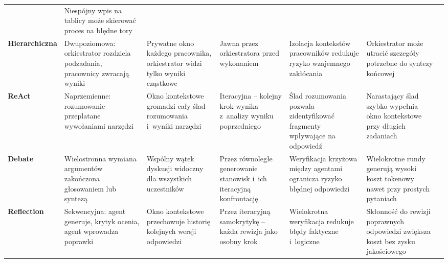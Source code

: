 \begin{table}
\begin{tabularx}{0.95\textheight}{@{} l L L L L L l @{}}
     & Niespójny wpis na tablicy może skierować proces na błędne tory
     & \cite{wang2024survey}                                                            \\
    \addlinespace
    \textbf{Hierarchiczna}
     & Dwupoziomowa: orkiestrator rozdziela podzadania, pracownicy zwracają wyniki
     & Prywatne okno każdego pracownika, orkiestrator widzi tylko wyniki cząstkowe
     & Jawna przez orkiestratora przed wykonaniem
     & Izolacja kontekstów pracowników redukuje ryzyko wzajemnego zakłócania
     & Orkiestrator może utracić szczegóły potrzebne do syntezy końcowej
     & \cite{hong2023metagpt, wu2024autogen}                                            \\
    \addlinespace
    \textbf{ReAct}
     & Naprzemienne: rozumowanie przeplatane wywołaniami narzędzi
     & Okno kontekstowe gromadzi cały ślad rozumowania i~wyniki narzędzi
     & Iteracyjna -- kolejny krok wynika z~analizy wyniku poprzedniego
     & Ślad rozumowania pozwala zidentyfikować fragmenty wpływające na odpowiedź
     & Narastający ślad szybko wypełnia okno kontekstowe przy długich zadaniach
     & \cite{yao2022react}                                                              \\
    \addlinespace
    \textbf{Debate}
     & Wielostronna wymiana argumentów zakończona głosowaniem lub syntezą
     & Wspólny wątek dyskusji widoczny dla wszystkich uczestników
     & Przez równoległe generowanie stanowisk i~ich iteracyjną konfrontację
     & Weryfikacja krzyżowa między agentami ogranicza ryzyko błędnej odpowiedzi
     & Wielokrotne rundy generują wysoki koszt tokenowy nawet przy prostych pytaniach
     & \cite{du2024improving}                                                           \\
    \addlinespace
    \textbf{Reflection}
     & Sekwencyjna: agent generuje, krytyk ocenia, agent wprowadza poprawki
     & Okno kontekstowe przechowuje historię kolejnych wersji odpowiedzi
     & Przez iteracyjną samokrytykę -- każda rewizja jako osobny krok
     & Wielokrotna weryfikacja redukuje błędy faktyczne i~logiczne
     & Skłonność do rewizji poprawnych odpowiedzi zwiększa koszt bez zysku jakościowego
     & \cite{shinn2024reflexion}                                                        \\
    \bottomrule
  \end{tabularx}
\end{table}

